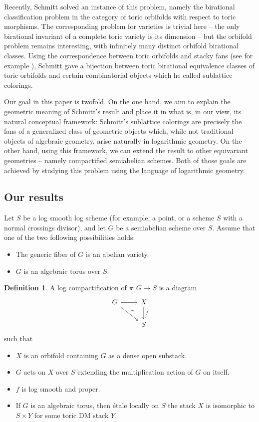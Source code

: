 \documentclass[11pt]{amsart}
\theoremstyle{definition}
\newtheorem{definition}[theorem]{Definition}
\theoremstyle{remark}
\begin{document}
Recently, Schmitt \cite{Schmitt} solved an instance of this problem, namely the
birational classification problem in the category of toric orbifolds with
respect to toric morphisms. The corresponding problem for varieties is trivial
here -- the only birational invariant of a complete toric variety is its
dimension -- but the orbifold problem remains interesting, with infinitely many
distinct orbifold birational classes. Using the correspondence between toric
orbifolds and stacky fans (see for example
\cite{Borisov_2004,fantechi2009smoothtoricdmstacks,Geraschenko_2014,ATheoryOfStaGillam2015}),
Schmitt gave a bijection between toric birational equivalence classes of toric
orbifolds and certain combinatorial objects which he called sublattice
colorings.

Our goal in this paper is twofold. On the one hand, we aim to explain the
geometric meaning of Schmitt's result and place it in what is, in our view,
its natural conceptual framework: Schmitt's sublattice colorings are precisely the fans of a generalized class of geometric objects which, while not traditional objects of algebraic geometry, arise naturally in logarithmic geometry. On the other hand, using this framework, we
can extend the result to other equivariant geometries -- namely compactified semiabelian schemes.
Both of those goals are achieved by studying this problem using the language of logarithmic geometry.

\subsection{Our results}
Let $S$ be a log smooth log
scheme (for example, a point, or a scheme $S$ with a normal crossings divisor),
and let $G$ be a semiabelian scheme over $S$. Assume that one of the two following
possibilities holds:

\begin{itemize}
	\item The generic fiber of $G$ is an abelian variety.
	\item $G$ is an algebraic torus over $S$.
\end{itemize}

\begin{definition}
	A log compactification of $\pi:G \to S$ is a diagram
	\[
	\begin{tikzcd}
		G \ar[r] \ar[dr,"\pi"] & X \ar[d,"f"] \\
		& S
	\end{tikzcd}
	\]
	such that
	\begin{itemize}
		\item $X$ is an orbifold containing $G$ as a dense open substack.
		\item $G$ acts on $X$ over $S$ extending the multiplication action of $G$ on itself.
		\item $f$ is log smooth and proper.
		\item If $G$ is an algebraic torus, then étale locally on $S$ the stack $X$ is isomorphic to $S\times Y$ for some toric DM stack $Y$.
	\end{itemize}
\end{definition}
\end{document}
